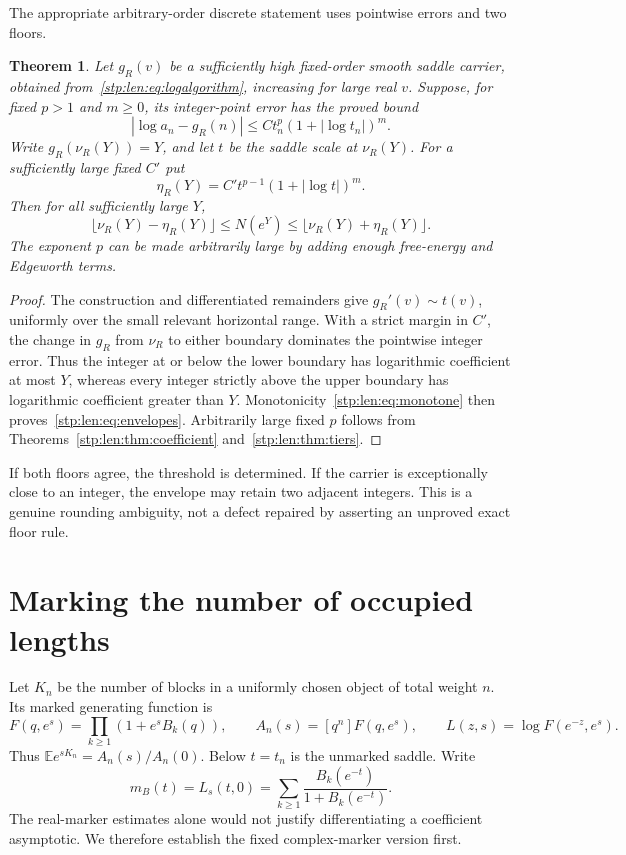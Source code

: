 \documentclass[11pt]{article}
\newtheorem{theorem}{Theorem}[section]
\theoremstyle{remark}\newtheorem{remark}[theorem]{Remark}
\newcommand{\E}{\mathbb E}
\begin{document}
The appropriate arbitrary-order discrete statement uses pointwise errors and two floors.
\begin{theorem}\label{stp:len:thm:envelopes}
Let $g_R(v)$ be a sufficiently high fixed-order smooth saddle carrier, obtained from~\eqref{stp:len:eq:logalgorithm}, increasing for large real $v$. Suppose, for fixed $p>1$ and $m\ge0$, its integer-point error has the proved bound
\[
 |\log a_n-g_R(n)|\le Ct_n^p(1+|\log t_n|)^m.
\]
Write $g_R(\nu_R(Y))=Y$, and let $t$ be the saddle scale at $\nu_R(Y)$. For a sufficiently large fixed $C'$ put
\[
 \eta_R(Y)=C't^{p-1}(1+|\log t|)^m.
\]
Then for all sufficiently large $Y$,
\begin{equation}\label{stp:len:eq:envelopes}
 \lfloor\nu_R(Y)-\eta_R(Y)\rfloor
 \le N(e^Y)\le
 \lfloor\nu_R(Y)+\eta_R(Y)\rfloor.
\end{equation}
The exponent $p$ can be made arbitrarily large by adding enough free-energy and Edgeworth terms.
\end{theorem}
\begin{proof}
The construction and differentiated remainders give $g_R'(v)\sim t(v)$, uniformly over the small relevant horizontal range. With a strict margin in $C'$, the change in $g_R$ from $\nu_R$ to either boundary dominates the pointwise integer error. Thus the integer at or below the lower boundary has logarithmic coefficient at most $Y$, whereas every integer strictly above the upper boundary has logarithmic coefficient greater than $Y$. Monotonicity~\eqref{stp:len:eq:monotone} then proves~\eqref{stp:len:eq:envelopes}. Arbitrarily large fixed $p$ follows from Theorems~\ref{stp:len:thm:coefficient} and~\ref{stp:len:thm:tiers}.
\end{proof}
If both floors agree, the threshold is determined. If the carrier is exceptionally close to an integer, the envelope may retain two adjacent integers. This is a genuine rounding ambiguity, not a defect repaired by asserting an unproved exact floor rule.

\section{Marking the number of occupied lengths}\label{stp:len:sec:marked}
Let $K_n$ be the number of blocks in a uniformly chosen object of total weight $n$. Its marked generating function is
\[
 F(q,e^s)=\prod_{k\ge1}(1+e^sB_k(q)),\qquad
 A_n(s)=[q^n]F(q,e^s),\qquad L(z,s)=\log F(e^{-z},e^s).
\]
Thus $\E e^{sK_n}=A_n(s)/A_n(0)$. Below $t=t_n$ is the unmarked saddle. Write
\begin{equation}\label{stp:len:eq:mB}
 m_B(t)=L_s(t,0)=\sum_{k\ge1}\frac{B_k(e^{-t})}{1+B_k(e^{-t})}.
\end{equation}
The real-marker estimates alone would not justify differentiating a coefficient asymptotic. We therefore establish the fixed complex-marker version first.
\end{document}
